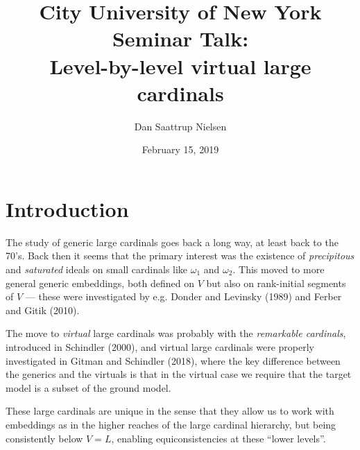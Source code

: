 


\title{City University of New York Seminar Talk:\\
        Level-by-level virtual large cardinals}
\author{Dan Saattrup Nielsen}
\date{February 15, 2019}
\maketitle


\section{Introduction}
The study of generic large cardinals goes back a long way, at least back to the 70's. Back then it seems that the primary interest was the existence of \textit{precipitous} and \textit{saturated} ideals on small cardinals like $\omega_1$ and $\omega_2$. This moved to more general generic embeddings, both defined on $V$ but also on rank-initial segments of $V$ --- these were investigated by e.g. Donder and Levinsky (1989) and Ferber and Gitik (2010).

\qquad The move to \textit{virtual} large cardinals was probably with the \textit{remarkable cardinals}, introduced in Schindler (2000), and virtual large cardinals were properly investigated in Gitman and Schindler (2018), where the key difference between the generics and the virtuals is that in the virtual case we require that the target model is a subset of the ground model.

\qquad These large cardinals are unique in the sense that they allow us to work with embeddings as in the higher reaches of the large cardinal hierarchy, but being consistently below $V=L$, enabling equiconsistencies at these ``lower levels''.

